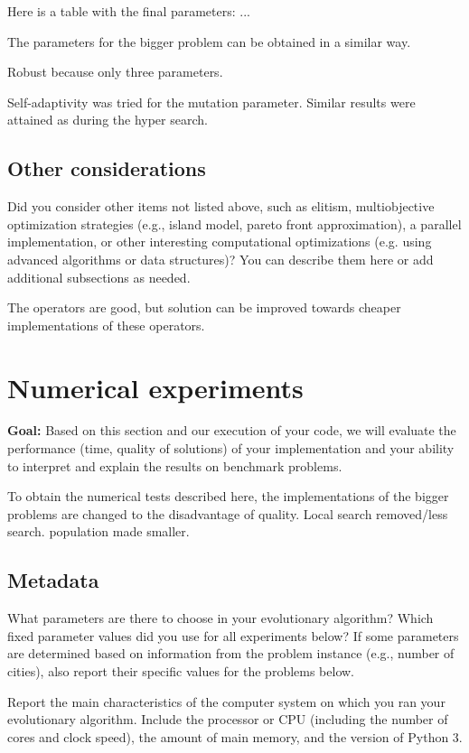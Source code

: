 \documentclass[a4paper,10pt]{article}
\newcommand{\ReplaceMe}[1]{{\color{blue}#1}}
\newcommand{\RemoveMe}[1]{{\color{purple}#1}}
\begin{document}
Here is a table with the final parameters: ...

The parameters for the bigger problem can be obtained in a similar way. 

Robust because only three parameters.


Self-adaptivity was tried for the mutation parameter. Similar results were attained as during the hyper search. 


\subsection{Other considerations}

\ReplaceMe{Did you consider other items not listed above, such as elitism, multiobjective optimization strategies (e.g., island model, pareto front approximation), a parallel implementation, or other interesting computational optimizations (e.g. using advanced algorithms or data structures)? You can describe them here or add additional subsections as needed.}

 The operators are good, but solution can be improved towards cheaper implementations of these operators.


\section{Numerical experiments}

\RemoveMe{\textbf{Goal:} Based on this section and our execution of your code, we will evaluate the performance (time, quality of solutions) of your implementation and your ability to interpret and explain the results on benchmark problems.}

To obtain the numerical tests described here, the implementations of the bigger problems are changed to the disadvantage of quality. Local search removed/less search. population made smaller. 

\subsection{Metadata}

\ReplaceMe{What parameters are there to choose in your evolutionary algorithm? Which fixed parameter values did you use for all experiments below? If some parameters are determined based on information from the problem instance (e.g., number of cities), also report their specific values for the problems below.

Report the main characteristics of the computer system on which you ran your evolutionary algorithm. Include the processor or CPU (including the number of cores and clock speed), the amount of main memory, and the version of Python 3.}
\end{document}
